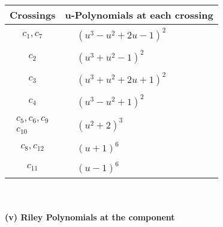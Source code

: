 \documentclass[1p]{elsarticle_modified}
\theoremstyle{definition}
\begin{document}
\begin{tabular}{m{50pt}|m{274pt}}
Crossings & \hspace{64pt}u-Polynomials at each crossing \\
\hline $$\begin{aligned}c_{1},c_{7}\end{aligned}$$&$\begin{aligned}
&(u^3- u^2+2 u-1)^2
\end{aligned}$\\
\hline $$\begin{aligned}c_{2}\end{aligned}$$&$\begin{aligned}
&(u^3+u^2-1)^2
\end{aligned}$\\
\hline $$\begin{aligned}c_{3}\end{aligned}$$&$\begin{aligned}
&(u^3+u^2+2 u+1)^2
\end{aligned}$\\
\hline $$\begin{aligned}c_{4}\end{aligned}$$&$\begin{aligned}
&(u^3- u^2+1)^2
\end{aligned}$\\
\hline $$\begin{aligned}c_{5},c_{6},c_{9}\\c_{10}\end{aligned}$$&$\begin{aligned}
&(u^2+2)^3
\end{aligned}$\\
\hline $$\begin{aligned}c_{8},c_{12}\end{aligned}$$&$\begin{aligned}
&(u+1)^6
\end{aligned}$\\
\hline $$\begin{aligned}c_{11}\end{aligned}$$&$\begin{aligned}
&(u-1)^6
\end{aligned}$\\
\hline
\end{tabular}\\~\\
\newpage\renewcommand{\arraystretch}{1}
\flushleft \textbf{(v) Riley Polynomials at the component}\newline \\
\end{document}
